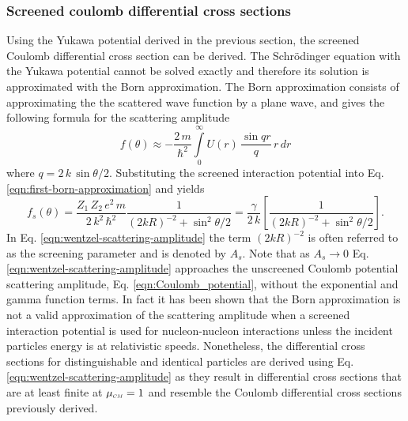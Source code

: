 \subsubsection{Screened coulomb differential cross sections}
Using the Yukawa potential derived in the previous section, the screened Coulomb differential cross section can be derived. The Schr\"{o}dinger equation with the Yukawa potential cannot be solved exactly and therefore its solution is approximated with the Born approximation. The Born approximation consists of approximating the the scattered wave function by a plane wave, and gives the following formula for the scattering amplitude
\begin{equation} \label{eqn:first-born-approximation}
    f(\theta) \approx - \dfrac{2 \, m}{\hbar^2} \int\limits_0^{\infty} U(r) \, \dfrac{\sin qr}{q} \, r \, dr
\end{equation}
where $q = 2 \, k \, \sin \theta / 2$. Substituting the screened interaction potential into Eq. \eqref{eqn:first-born-approximation} and yields
\begin{equation} \label{eqn:wentzel-scattering-amplitude}
    f_s(\theta) = \dfrac{Z_1 \, Z_2 \, e^2 \, m}{2 \, k^2 \, \hbar^2} \dfrac{1}{(2kR)^{-2} + \sin^2 \theta/2} = \dfrac{\gamma}{2 \, k} \left[\dfrac{1}{(2kR)^{-2} + \sin^2 \theta/2}\right].
\end{equation}
In Eq. \eqref{eqn:wentzel-scattering-amplitude} the term $(2kR)^{-2}$ is often referred to as the screening parameter and is denoted by $A_s$. Note that as $A_s \rightarrow 0$ Eq. \eqref{eqn:wentzel-scattering-amplitude} approaches the unscreened Coulomb potential scattering amplitude, Eq. \eqref{eqn:Coulomb_potential}, without the exponential and gamma function terms. In fact it has been shown that the Born approximation is not a valid approximation of the scattering amplitude when a screened interaction potential is used for nucleon-nucleon interactions unless the incident particles energy is at relativistic speeds. Nonetheless, the differential cross sections for distinguishable and identical particles are derived using Eq. \eqref{eqn:wentzel-scattering-amplitude} as they result in differential cross sections that are at least finite at $\mucm = 1$ and resemble the Coulomb differential cross sections previously derived.

